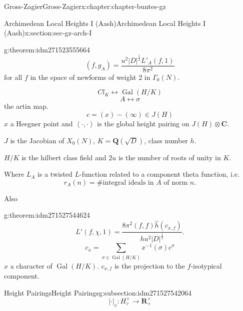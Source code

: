 \documentclass[oneside,10pt,]{book}
\numberwithin{equation}{section}
\newcommand{\inv}{^{-1}}
\newcommand{\pair}[2]{\left\langle #1, #2 \right\rangle}
\newcommand{\QQ}{\mathbf{Q}}
\newcommand{\RR}{\mathbf{R}}
\newcommand{\CC}{\mathbf{C}}
\newcommand{\Gal}[2]{\operatorname{Gal}(#1/#2)}
\begin{document}
\begin{chapterptx}{Gross-Zagier}{}{Gross-Zagier}{}{}{x:chapter:chapter-buntes-gz}
\begin{sectionptx}{Archimedean Local Heights I (Aash)}{}{Archimedean Local Heights I (Aash)}{}{}{x:section:sec-gz-arch-I}
\begin{introduction}{}
\begin{theorem}{}{}{g:theorem:idm271523555664}
\begin{equation*}
(f,g_A) = \frac{u^2 |D|^{\frac 12} L'_A(f,1)}{8\pi ^2}
\end{equation*}
for all \(f\) in the space of newforms of weight 2 in \(\Gamma _0(N)\).%
\end{theorem}
%
\begin{equation*}
Cl_K \leftrightarrow \Gal HK
\end{equation*}
%
\begin{equation*}
A \leftrightarrow \sigma 
\end{equation*}
the artin map.%
\begin{equation*}
c = (x) - (\infty ) \in J(H)
\end{equation*}
\(x\) a Heegner point and \(\pair \cdot\cdot\) is the global height pairing on \(J(H) \otimes \CC\).%
\par
\(J\) is the Jacobian of \(X_0(N)\), \(K = \QQ(\sqrt{D})\), class  number \(h\).%
\par
\(H/K\) is the hilbert class field and \(2u\) is the number of roots of unity in \(K\).%
\par
Where \(L_A\) is a twisted \(L\)-function related to a component theta function, i.e.%
\begin{equation*}
r_A(n) =\# \text{integral ideals in } A \text{ of norm }n\text{.}
\end{equation*}
%
\par
Also%
\begin{theorem}{}{}{g:theorem:idm271527544624}%
%
\begin{equation*}
L'(f,\chi ,1) = \frac{8\pi ^2 (f, f) \hat h(c_{x,f})}{hu^2 |D|^{\frac12}}\text{.}
\end{equation*}
%
\begin{equation*}
c_x = \sum_{\sigma \in \Gal HK} x\inv(\sigma ) c^\sigma 
\end{equation*}
\(x\) a character of \(\Gal HK\). \(c_{x,f}\) is the projection to the \(f\)-isotypical component.%
\end{theorem}
\end{introduction}%
%
%
\typeout{************************************************}
\typeout{************************************************}
%
\begin{subsectionptx}{Height Pairings}{}{Height Pairings}{}{}{g:subsection:idm271527542064}
%
\begin{equation*}
| \cdot |_v \colon  H_v^\times \to \RR_+^\times
\end{equation*}
%
\begin{equation*}

\end{equation*}
\end{subsectionptx}
\end{sectionptx}
\end{chapterptx}
\end{document}
